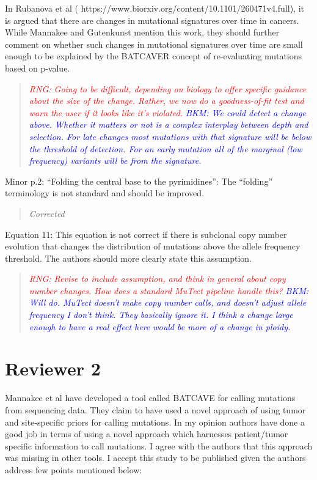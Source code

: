 \documentclass[11pt]{article}
\newcommand{\BKM}[1]{\textcolor{blue}{BKM: #1}}
\newcommand{\RNG}[1]{\textcolor{red}{RNG: #1}}
\newenvironment{response}
{\begin{quote}\itshape}
{\end{quote}}
\begin{document}
In Rubanova et al ( https://www.biorxiv.org/content/10.1101/260471v4.full), it is argued that there are changes in mutational signatures over time in cancers. While Mannakee and Gutenkunst mention this work, they should further comment on whether such changes in mutational signatures over time are small enough to be explained by the BATCAVER concept of re-evaluating mutations based on p-value.
\begin{response}
\RNG{Going to be difficult, depending on biology to offer specific guidance about the size of the change. Rather, we now do a goodness-of-fit test and warn the user if it looks like it's violated.}
\BKM{We could detect a change above. Whether it matters or not is a complex interplay between depth and selection. For late changes most mutations with that signature will be below the threshold of detection. For an early mutation all of the marginal (low frequency) variants will be from the signature.}
\end{response}

Minor
p.2: “Folding the central base to the pyrimidines”: The “folding” terminology is not standard and should be improved. 
\begin{response}
Corrected
\end{response}

Equation 11: This equation is not correct if there is subclonal copy number evolution that changes the distribution of mutations above the allele frequency threshold. The authors should more clearly state this assumption.
\begin{response}
\RNG{Revise to include assumption, and think in general about copy number changes. How does a standard MuTect pipeline handle this?}
\BKM{Will do. MuTect doesn't make copy number calls, and doesn't adjust allele frequency I don't think. They basically ignore it. I think a change large enough to have a real effect here would be more of a change in ploidy.}
\end{response}

\section*{Reviewer 2}

Mannakee et al have developed a tool called BATCAVE for calling mutations from sequencing data. They claim to have used a novel approach of using tumor and site-specific priors for calling mutations. In my opinion authors have done a good job in terms of using a novel approach which harnesses patient/tumor specific information to call mutations. I agree with the authors that this approach was missing in other tools. I accept this study to be published given the authors address few points mentioned below:
\end{document}

